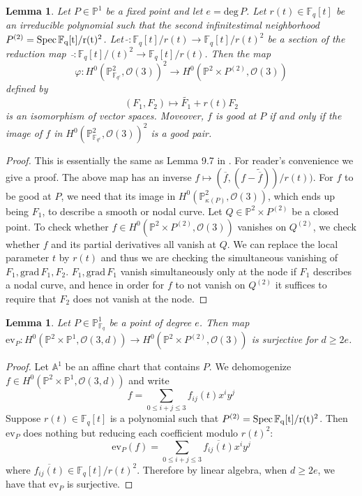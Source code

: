 \documentclass[12pt]{article}
\theoremstyle{plain}
\newtheorem{lemma}[equation]{Lemma}
\theoremstyle{definition}
\newcommand{\IA}{\mathbb{A}}
\newcommand{\IF}{\mathbb{F}}
\newcommand{\IP}{\mathbb{P}}
\newcommand{\sO}{\mathcal{O}}
\renewcommand{\deg}{\mathrm{deg}\,}
\newcommand{\Spec}{\rm Spec\,}
\newcommand{\<}{\langle}
\renewcommand{\>}{\rangle}
\def\wt{\widetilde}
\newcommand{\grad}{\mathrm{grad}\,}
\newcommand{\ev}{\mathrm{ev}}
\begin{document}
\begin{lemma}
Let $P \in \IP^1$ be a fixed point and let $e = \deg P$. Let $r(t) \in \IF_q[t]$ be an irreducible polynomial such that the second infinitestimal neighborhood $P^{(2)} = \Spec \IF_q[t]/r(t)^2$. Let $\, \wt{} : \IF_q[t]/r(t) \to \IF_q[t]/r(t)^2$ be a section of the reduction map $\, \bar{} : \IF_q[t]/(t)^2 \to \IF_q[t]/r(t)$. Then the map
$$ \varphi : H^0(\IP^2_{\IF_{q^e}} , \sO(3))^2 \to H^0(\IP^2 \times P^{(2)}, \sO(3))$$ defined by 
$$ (F_1, F_2) \mapsto \wt{F_1} + r(t) F_2 $$
is an isomorphism of vector spaces. Moveover, $f$ is good at $P$ if and only if the image of $f$ in $H^0(\IP^2_{\IF_{q^e}} , \sO(3))^2$ is a good pair. 
\end{lemma}
\begin{proof}
This is essentially the same as Lemma 9.7 in \cite{Wood}. For reader's convenience we give a proof. The above map has an inverse $f \mapsto (\overline{f}, (f - \wt{\overline{f}}))/r(t))$. For $f$ to be good at $P$, we need that its image in $H^0(\IP^2_{\kappa(P)}, \sO(3))$, which ends up being $F_1$, to describe a smooth or nodal curve. Let $Q \in \IP^2 \times P^{(2)}$ be a closed point. To check whether $f \in H^0(\IP^2 \times P^{(2)}, \sO(3))$ vanishes on $Q^{(2)}$, we check whether $f$ and its partial derivatives all vanish at $Q$. We can replace the local parameter $t$ by $r(t)$ and thus we are checking the simultaneous vanishing of $F_1, \grad F_1, F_2$. $F_1, \grad F_1$ vanish simultaneously only at the node if $F_1$ describes a nodal curve, and hence in order for $f$ to not vanish on $Q^{(2)}$ it suffices to require that $F_2$ does not vanish at the node. 
\end{proof}
\begin{lemma}
\label{pointsurj}
Let $P \in \IP^1_{\IF_q}$ be a point of degree $e$. Then map $\ev_P : H^0(\IP^2 \times \IP^1, \sO(3, d)) \to H^0(\IP^2 \times P^{(2)}, \sO(3))$ is surjective for $d \ge 2e$. 
\end{lemma}
\begin{proof}
Let $\IA^1$ be an affine chart that contains $P$. We dehomogenize $f \in H^0(\IP^2 \times \IP^1, \sO(3, d))$ and write $$f = \sum_{0 \le i + j \le 3} f_{ij}(t) x^i y^j$$ Suppose $r(t) \in \IF_q[t]$ is a polynomial such that $P^{(2)} = \Spec \IF_q[t]/r(t)^2$. Then $\ev_P$ does nothing but reducing each coefficient modulo $r(t)^2$:
$$ \ev_P(f) = \sum_{0 \le i + j \le 3} \overline{f_{ij}(t)}x^i y^j $$ 
where $\overline{f_{ij}(t)} \in \IF_q[t]/r(t)^2$. Therefore by linear algebra, when $d \ge 2e$, we have that $\ev_P$ is surjective. 
\end{proof}
\end{document}
